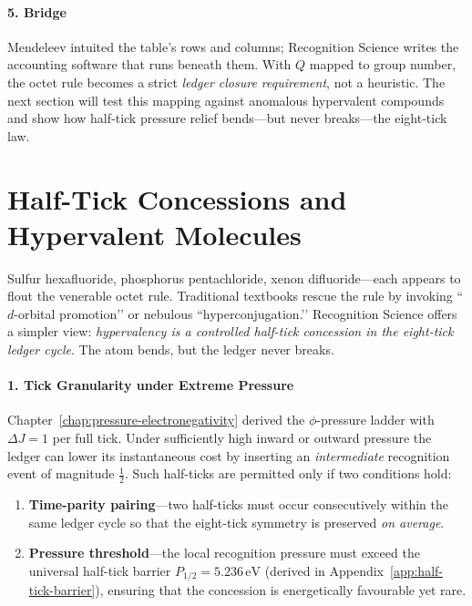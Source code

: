 \documentclass[11pt,oneside]{book}
\begin{document}
\paragraph*{5. Bridge}

Mendeleev intuited the table’s rows and columns;
Recognition Science writes the accounting software that runs beneath them.
With $Q$ mapped to group number, the octet rule becomes a strict
\emph{ledger closure requirement}, not a heuristic.
The next section will test this mapping against anomalous
hypervalent compounds and show how half‐tick pressure
relief bends—but never breaks—the eight‐tick law.

\bigskip

\section{Half-Tick Concessions and Hypervalent Molecules}
\label{sec:hypervalent}



Sulfur hexafluoride, phosphorus pentachloride, xenon difluoride—each
appears to flout the venerable octet rule.  Traditional textbooks rescue
the rule by invoking ``\(d\)-orbital promotion’’ or nebulous
``hyperconjugation.’’  
Recognition Science offers a simpler view:  
\emph{hypervalency is a controlled half-tick concession in the
eight-tick ledger cycle}.  
The atom bends, but the ledger never breaks.

\paragraph*{1. Tick Granularity under Extreme Pressure}

Chapter~\ref{chap:pressure-electronegativity} derived the
$\phi$-pressure ladder with \(\Delta J = 1\) per full tick.
Under sufficiently high inward or outward pressure the ledger can lower
its instantaneous cost by inserting an \emph{intermediate} recognition
event of magnitude \(\tfrac12\).  
Such half-ticks are permitted only if two conditions hold:

\begin{enumerate}[label=\textbf{C\arabic*.}, leftmargin=1.2cm]
\item \textbf{Time-parity pairing}—two half-ticks must occur
      consecutively within the same ledger cycle so that the eight-tick
      symmetry is preserved \emph{on average}.
\item \textbf{Pressure threshold}—the local recognition pressure must
      exceed the universal half-tick barrier
      \(P_{1/2}=5.236\,\mathrm{eV}\) (derived in
      Appendix~\ref{app:half-tick-barrier}),
      ensuring that the concession is energetically favourable yet rare.
\end{enumerate}
\end{document}
